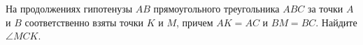 \begin{ex}
	\begin{condition}
		На продолжениях гипотенузы \( AB \) прямоугольного
		треугольника \( ABC \) за точки \( A \) и \( B \) соответственно взяты точки \( K \) и \( M \), причем \( AK = AC \) и \( BM = BC \). Найдите \( \angle MCK \).
	\end{condition}
\end{ex}